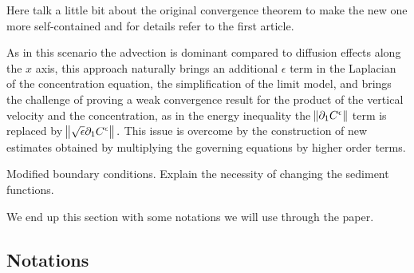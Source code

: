 \documentclass[11pt]{article}
\begin{document}
Here  talk a little bit about the original convergence theorem to make the new one more self-contained and for details refer to the first article.

As in this scenario the advection is dominant compared to diffusion effects along the $x$ axis, this approach naturally brings an additional $\epsilon$ term in the Laplacian of the concentration equation, the simplification of the limit model, and brings the challenge of proving a weak convergence result for the product of the vertical velocity and the concentration, as in the energy inequality the $\norm{\partial_1 C^\epsilon}$ term is replaced by $\norm{\sqrt{\epsilon} \partial_1 C^\epsilon}.$ This issue is overcome by the construction of new estimates obtained by multiplying the governing equations by higher order terms.

Modified boundary conditions. Explain the necessity of changing the sediment functions.

We end up this section with some notations we will use through the paper.

\subsection{Notations}
\end{document}
